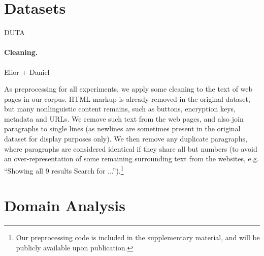 \documentclass[11pt,a4paper]{article}
\begin{document}
\section{Datasets}\label{sec:data}

DUTA \citep{AlNabki17}

\paragraph{Cleaning.} Elior + Daniel

As preprocessing for all experiments, we apply some cleaning to the text
of web pages in our corpus.
HTML markup is already removed in the original dataset,
but many nonlinguistic content remains, such as
buttons, encryption keys, metadata and URLs.
We remove such text from the web pages, and also join paragraphs to single lines
(as newlines are sometimes present in the original dataset for display purposes
only).
We then remove any duplicate paragraphs, where paragraphs are considered
identical if they share all but numbers
(to avoid an over-representation of some remaining surrounding text from the
websites, e.g. ``Showing all 9 results Search for
...'').\footnote{Our preprocessing code is included in the supplementary
material, and will be publicly available upon publication.}

\section{Domain Analysis}
\end{document}
